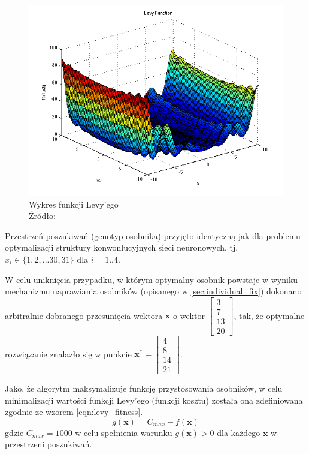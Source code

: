 \begin{figure}[h!tb]
	 \centering
	 \includegraphics[width = 1.0\linewidth]{img/levy}
	 \caption{Wykres funkcji Levy'ego \\
              Źródło: \cite{simulationlib}}
	 \label{fig:levyfunction}
\end{figure}

Przestrzeń poszukiwań (genotyp osobnika) przyjęto identyczną jak dla problemu optymalizacji struktury konwonlucyjnych sieci neuronowych, tj. $x_i \in \lbrace 1, 2, ... 30, 31 \rbrace$ dla $i = 1..4$.

W celu uniknięcia przypadku, w którym optymalny osobnik powstaje w wyniku mechanizmu naprawiania osobników (opisanego w \ref{sec:individual_fix}) dokonano arbitralnie dobranego przesunięcia wektora $\mathbf{x}$ o wektor $\begin{bmatrix}3 \\ 7 \\ 13 \\ 20\end{bmatrix}$, tak, że optymalne rozwiązanie znalazło się w punkcie $\mathbf{x^*} = \begin{bmatrix}4 \\ 8 \\ 14 \\ 21\end{bmatrix}$.

Jako, że algorytm maksymalizuje funkcję przystosowania osobników, w celu minimalizacji wartości funkcji Levy'ego (funkcji kosztu) została ona zdefiniowana zgodnie ze wzorem \ref{eqn:levy_fitness}. \cite{bialaszewski2012}
\begin{equation}\label{eqn:levy_fitness}
  g(\mathbf{x}) = C_{max} - f(\mathbf{x})
\end{equation}
gdzie $C_{max} = 1000$ w celu spełnienia warunku $g(\textbf{x}) > 0$ dla każdego $\textbf{x}$ w przestrzeni poszukiwań.

